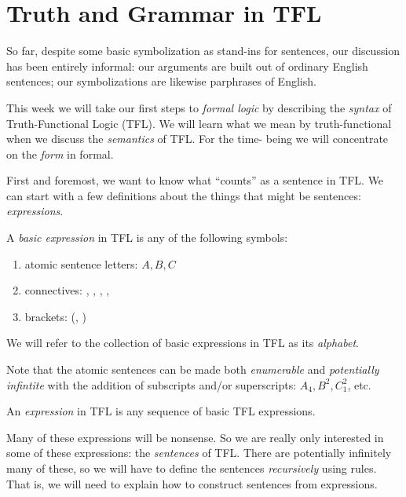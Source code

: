 \section{Truth and Grammar in TFL}

So far, despite some basic symbolization as stand-ins for sentences, our
discussion has been entirely informal: our arguments are built out of
ordinary English sentences; our symbolizations are likewise parphrases of
English.

This week we will take our first steps to \emph{formal logic} by describing
the \emph{syntax} of Truth-Functional Logic (TFL). We will learn what we mean
by truth-functional when we discuss the \emph{semantics} of TFL. For the time-
being we will concentrate on the \emph{form} in formal.

First and foremost, we want to know what ``counts'' as a sentence in TFL. We can
start with a few definitions about the things that might be sentences:
\emph{expressions}.

\begin{definition}
  \label{def:tfl-basic-expression}
  A \emph{basic expression} in TFL is any of the following symbols:
  \begin{enumerate}
  \item atomic sentence letters: $A, B, C$
  \item connectives: \enot, \eand, \eor, \eif, \eiff
  \item brackets: (, )
  \end{enumerate}
  We will refer to the collection of basic expressions in TFL as its
  \emph{alphabet}.
\end{definition}

Note that the atomic sentences can be made both \emph{enumerable} and
\emph{potentially infintite} with the addition of subscripts and/or
superscripts: $A_4, B^2, C_1^2$, etc.

\begin{definition}
  \label{def:tfl-expression}
  An \emph{expression} in TFL is any sequence of basic TFL expressions.
\end{definition}

Many of these expressions will be nonsense. So we are really only interested in
some of these expressions: the \emph{sentences} of TFL. There are potentially
infinitely many of these, so we will have to define the sentences
\emph{recursively} using rules. That is, we will need to explain how to
construct sentences from expressions.

